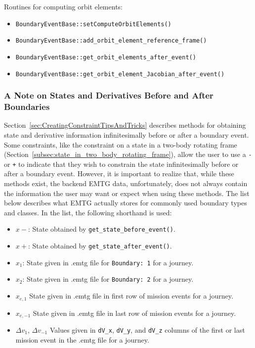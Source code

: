 \documentclass[11pt]{article}
\begin{document}
Routines for computing orbit elements:

\begin{itemize}
	\item \texttt{BoundaryEventBase::setComputeOrbitElements()}
	\item \texttt{BoundaryEventBase::add\_orbit\_element\_reference\_frame()}
	\item \texttt{BoundaryEventBase::get\_orbit\_elements\_after\_event()}
	\item \texttt{BoundaryEventBase::get\_orbit\_element\_Jacobian\_after\_event()}
\end{itemize}

\subsubsection{A Note on States and Derivatives Before and After Boundaries}
\label{sec:states_and_derivatives_before_and_after_boundaries}

Section~\ref{sec:CreatingConstraintTipsAndTricks} describes methods for obtaining state and derivative information infinitesimally before or after a boundary event. Some constraints, like the constraint on a state in a two-body rotating frame (Section~\ref{subsec:state_in_two_body_rotating_frame}), allow the user to use a \texttt{-} or \texttt{+} to indicate that they wish to constrain the state infinitesimally before or after a boundary event. However, it is important to realize that, while these methods exist, the backend EMTG data, unfortunately, does not always contain the information the user may want or expect when using these methods. The list below describes what EMTG actually stores for commonly used boundary types and classes. In the list, the following shorthand is used:

\begin{itemize}
	\item $x-$: State obtained by \texttt{get\_state\_before\_event()}.
	\item $x+$: State obtained by \texttt{get\_state\_after\_event()}.
	\item $x_1$: State given in .emtg file for \texttt{Boundary: 1} for a journey.
	\item $x_2$: State given in .emtg file for \texttt{Boundary: 2} for a journey.
	\item $x_{e,1}$ State given in .emtg file in first row of mission events for a journey.
	\item $x_{e,-1}$ State given in .emtg file in last row of mission events for a journey.
	\item $\Delta v_1$, $\Delta v_{-1}$ Values given in \texttt{dV\_x}, \texttt{dV\_y}, and \texttt{dV\_z} columns of the first or last mission event in the .emtg file for a journey.
\end{itemize}
\end{document}
